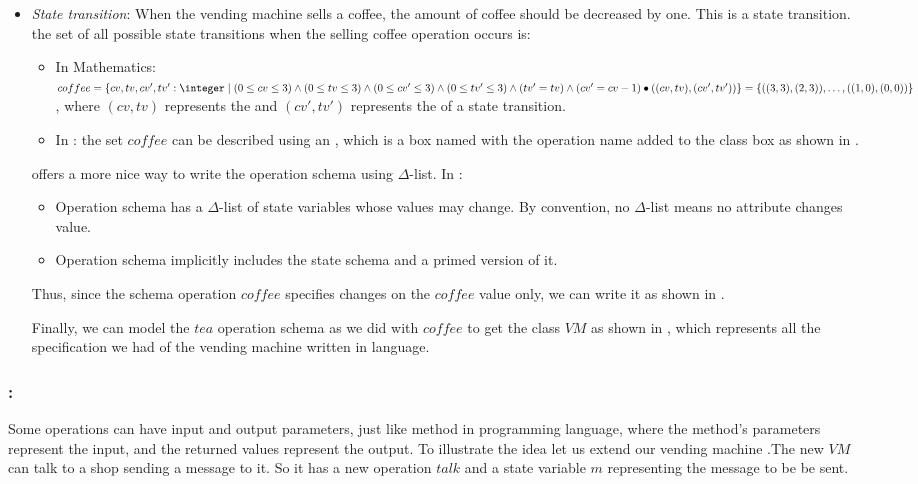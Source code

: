 \begin{itemize}
\item \textit{State transition}: When the vending machine sells a coffee, the amount of coffee should be decreased by one. This is a state transition.
the set of all possible state transitions when the selling coffee operation occurs is:
\begin{itemize}
\item In Mathematics: $coffee =\{cv,tv,cv',tv': \integer\mid (0 \leq  cv \leq 3) \wedge
(0 \leq  tv \leq 3)\wedge (0 \leq  cv' \leq 3) \wedge (0 \leq  tv' \leq 3)\wedge (tv' = tv) \wedge (cv' = cv - 1) \bullet\pair{\pair{cv}{tv}}{\pair{cv'}{tv'}}\}  =\{\pair{\pair{3}{3}}{\pair{2}{3}},\dots,\pair{\pair{1}{0}}{\pair{0}{0}}\}$, where $(cv,tv)$ represents the  and $(cv',tv')$ represents the  of a state transition.
\item In \oz{}: the set $coffee$ can be described using an , which is a box named with the operation name added to the class box as shown in .
\end{itemize}


\oz{} offers a more nice way to write the operation schema using $\Delta$-list. In \oz{}:
\begin{itemize}
\item Operation schema has a $\Delta$-list of state variables
whose values may change. By convention, no $\Delta$-list means
no attribute changes value.
\item Operation schema implicitly
includes the state schema and a primed version of it.
\end{itemize}
Thus, since the schema operation $coffee$ specifies changes on the $coffee$ value only, we can write it as shown in . 


Finally, we can model the $tea$ operation schema as we did with $coffee$ to get the class $VM$ as shown in , which represents all the specification we had of the vending machine written in \oz{} language.

\end{itemize}

\subsubsection{:} 
\label{operation_input_output_parameters} 
Some operations can have input and output parameters, just like method in programming language, where the method's parameters represent the input, and the returned values represent the output. To illustrate the idea let us extend our vending machine .The new $VM$ can talk to a shop sending a message to it. So it has a new operation $talk$ and a state variable $m$ representing the message to be be sent.

